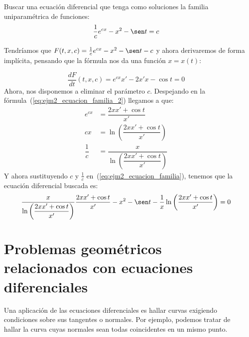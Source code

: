 \begin{ejemplo}
    Buscar una ecuación diferencial que tenga como soluciones la familia uniparamétrica de funciones:
    \begin{equation}\label{eq:ejm2_ecuacion_familia}
        \dfrac{1}{c}e^{cx} - x^2 - \sen t = c
    \end{equation}
% 
% 

    Tendríamos que $F(t,x,c) = \frac{1}{c}e^{cx} - x^2-\sen t - c$ y ahora derivaremos de forma implícita, pensando que la fórmula nos da una función $x=x(t)$:

    \begin{equation}\label{eq:ejm2_ecuacion_familia_2}
        \dfrac{d F}{d t}(t,x,c) = e^{cx}x' - 2x'x - \cos t = 0
    \end{equation}
    Ahora, nos disponemos a eliminar el parámetro $c$. Despejando en la fórmula~(\ref{eq:ejm2_ecuacion_familia_2}) llegamos a que:
    \begin{align*}
        e^{cx} &= \dfrac{2xx' + \cos t}{x'} \\
        cx &= \ln\left(\dfrac{2xx'+\cos t}{x'}\right) \\
        \dfrac{1}{c} &= \dfrac{x}{\ln \left(\dfrac{2xx' + \cos t}{x'}\right)}
    \end{align*}
    Y ahora sustituyendo $c$ y $\frac{1}{c}$ en~(\ref{eq:ejm2_ecuacion_familia}), tenemos que la ecuación diferencial buscada es:
    \begin{equation*}
       \dfrac{x}{\ln \left(\dfrac{2xx' + \cos t}{x'}\right)} \dfrac{2xx' + \cos t}{x'} - x^2-\sen t - \dfrac{1}{x}\ln \left(\dfrac{2xx' + \cos t}{x'}\right) = 0
    \end{equation*}
\end{ejemplo}

\section{Problemas geométricos relacionados con ecuaciones diferenciales}
Una aplicación de las ecuaciones diferenciales es hallar curvas exigiendo condiciones sobre sus tangentes o normales. Por ejemplo, podemos tratar de hallar la curva cuyas normales sean todas coincidentes en un mismo punto.

